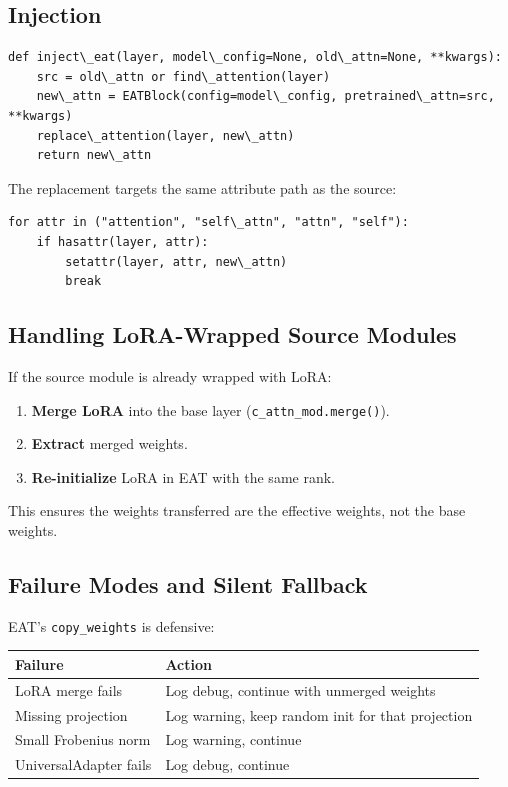\subsection{Injection}

\begin{lstlisting}
def inject\_eat(layer, model\_config=None, old\_attn=None, **kwargs):
    src = old\_attn or find\_attention(layer)
    new\_attn = EATBlock(config=model\_config, pretrained\_attn=src, **kwargs)
    replace\_attention(layer, new\_attn)
    return new\_attn
\end{lstlisting}

The replacement targets the same attribute path as the source:

\begin{lstlisting}
for attr in ("attention", "self\_attn", "attn", "self"):
    if hasattr(layer, attr):
        setattr(layer, attr, new\_attn)
        break
\end{lstlisting}

\subsection{Handling LoRA-Wrapped Source Modules}

If the source module is already wrapped with LoRA:

\begin{enumerate}
\item \textbf{Merge LoRA} into the base layer (\texttt{c\_attn\_mod.merge()}).
\item \textbf{Extract} merged weights.
\item \textbf{Re-initialize} LoRA in EAT with the same rank.

\end{enumerate}
This ensures the weights transferred are the effective weights, not the 
base weights.

\subsection{Failure Modes and Silent Fallback}

EAT's \texttt{copy\_weights} is defensive:

\begin{table}[H]
\centering
\small
\begin{tabular}{ll}
\toprule
\textbf{Failure} & \textbf{Action} \\
\midrule
LoRA merge fails & Log debug, continue with unmerged weights \\
Missing projection & Log warning, keep random init for that projection \\
Small Frobenius norm & Log warning, continue \\
UniversalAdapter fails & Log debug, continue \\
\bottomrule
\end{tabular}
\end{table}

